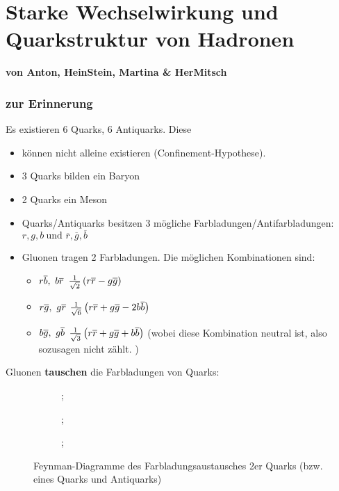 \documentclass[Ex4_Zusammenfassung.tex]{subfiles}
\begin{document}
\chapter{Starke Wechselwirkung und Quarkstruktur von Hadronen}
\textbf{von Anton, HeinStein, Martina \& HerMitsch}
\subsection{zur Erinnerung}
Es existieren 6 Quarks, 6 Antiquarks. Diese
\begin{itemize}
	\item können nicht alleine existieren (Confinement-Hypothese).
	\item 3 Quarks bilden ein Baryon
	\item 2 Quarks ein Meson
	\item Quarks/Antiquarks besitzen 3 mögliche Farbladungen/Antifarbladungen: $r,g,b\ \text{und } \overline{r}, \overline{g}, \overline{b}$
	\item Gluonen tragen 2 Farbladungen. Die möglichen Kombinationen sind:
		\begin{itemize}
			\item[] $r\overline{b},\ b\overline{r}$ \qquad $\frac{1}{\sqrt{2}}\left(  r\overline{r} - g\overline{g} \right)$
			\item[] $r\overline{g},\ g\overline{r}$ \qquad $\frac{1}{\sqrt{6}}\left(  r\overline{r} + g\overline{g} - 2b\overline{b} \right)$
			\item[] $b\overline{g},\ g\overline{b}$ \qquad $\frac{1}{\sqrt{3}}\left( r\overline{r} + g\overline{g} + b\overline{b}  \right)$ (wobei diese Kombination neutral ist, also sozusagen nicht zählt. )
		\end{itemize}
\end{itemize}
Gluonen \textbf{tauschen} die Farbladungen von Quarks:
\begin{figure}[h]
	\centering
	\begin{subfigure}{0.3\textwidth}
		\centering
			;
	\end{subfigure}
	\quad
	\begin{subfigure}{0.3\textwidth}
		\centering
		;
	\end{subfigure}
	\quad 
	\begin{subfigure}{0.3\textwidth}
		\centering
		;
	\end{subfigure}
	\caption{Feynman-Diagramme des Farbladungsaustausches 2er Quarks (bzw. eines Quarks und Antiquarks)}
\end{figure}
\end{document}
